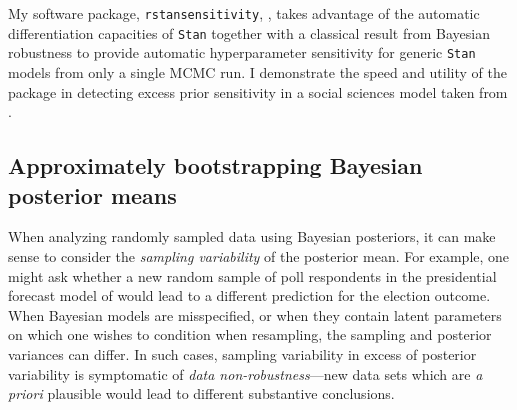 My software package, \texttt{rstansensitivity},
\citep{giordano:2020:rstansensitivity, giordano:2018:mcmchyper}, takes advantage
of the automatic differentiation capacities of \texttt{Stan}
together with a classical result from  Bayesian
robustness \citep{gustafson:1996:localposterior,
giordano:2018:covariances} to provide automatic hyperparameter sensitivity for
generic \texttt{Stan} models from only a single MCMC run.  I demonstrate the
speed and utility of the package in detecting excess prior sensitivity in a
social sciences model taken from \citet[Chapter 13.5]{gelman:2006:arm}.


\subsection{Approximately bootstrapping Bayesian posterior means}
%
When analyzing randomly sampled data using Bayesian posteriors, it can make
sense to consider the \emph{sampling variability} of the posterior mean.  For
example, one might ask whether a new random sample of poll respondents in the
presidential forecast model of \citet{economist:2020:election} would lead to a
different prediction for the election outcome.  When Bayesian models are
misspecified, or when they contain latent parameters on which one wishes to
condition when resampling, the sampling and posterior variances can differ.  In
such cases, sampling variability in excess of posterior variability is
symptomatic of \emph{data non-robustness}---new data sets which are \textit{a
priori} plausible would lead to different substantive conclusions.


